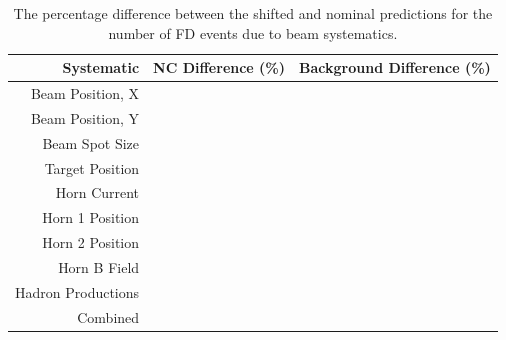 \begin{table}[h]
  \begin{center}
    \caption[Beam Systematic Errors]{The percentage difference between the shifted and nominal predictions for the number of FD events due to beam systematics.}
    \label{tab:SystBeam}
    \begin{tabular}{r c c}
      \hline\hline
      Systematic & NC Difference (\%) & Background Difference (\%) \\
      \hline
      Beam Position, X & & \\
      Beam Position, Y & & \\
      Beam Spot Size & & \\
      Target Position & & \\
      Horn Current & & \\
      Horn 1 Position & & \\
      Horn 2 Position & & \\
      Horn B Field & & \\
      Hadron Productions & & \\
      Combined & & \\
      \hline
    \end{tabular}
  \end{center}
\end{table}

